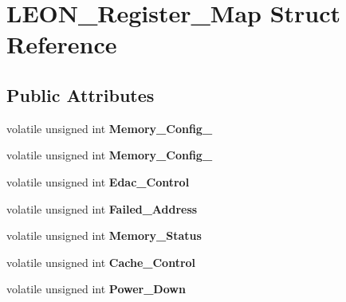 \hypertarget{struct_l_e_o_n___register___map}{
\section{LEON\_\-Register\_\-Map Struct Reference}
\label{struct_l_e_o_n___register___map}
}
\subsection*{Public Attributes}
\begin{DoxyCompactItemize}
\item 
\hypertarget{struct_l_e_o_n___register___map_a30282acaae5bf385d4243c548fb37c82}{
volatile unsigned int {\bfseries Memory\_\-Config\_}}
\label{struct_l_e_o_n___register___map_a30282acaae5bf385d4243c548fb37c82}

\item 
\hypertarget{struct_l_e_o_n___register___map_a7032e5a694fee58bf17913f55fd5f336}{
volatile unsigned int {\bfseries Memory\_\-Config\_}}
\label{struct_l_e_o_n___register___map_a7032e5a694fee58bf17913f55fd5f336}

\item 
\hypertarget{struct_l_e_o_n___register___map_abb0086571e69d7592845de920987a87c}{
volatile unsigned int {\bfseries Edac\_\-Control}}
\label{struct_l_e_o_n___register___map_abb0086571e69d7592845de920987a87c}

\item 
\hypertarget{struct_l_e_o_n___register___map_a22795fa879fefa39229ea8cbe6f206f4}{
volatile unsigned int {\bfseries Failed\_\-Address}}
\label{struct_l_e_o_n___register___map_a22795fa879fefa39229ea8cbe6f206f4}

\item 
\hypertarget{struct_l_e_o_n___register___map_aff88a4ac8955fa5541a05749ece9cbd7}{
volatile unsigned int {\bfseries Memory\_\-Status}}
\label{struct_l_e_o_n___register___map_aff88a4ac8955fa5541a05749ece9cbd7}

\item 
\hypertarget{struct_l_e_o_n___register___map_a616a15d9747eb0ab671a0b3dc21a5412}{
volatile unsigned int {\bfseries Cache\_\-Control}}
\label{struct_l_e_o_n___register___map_a616a15d9747eb0ab671a0b3dc21a5412}

\item 
\hypertarget{struct_l_e_o_n___register___map_a597ec2ee3c58b06917a8b4c29461bfc8}{
volatile unsigned int {\bfseries Power\_\-Down}}
\label{struct_l_e_o_n___register___map_a597ec2ee3c58b06917a8b4c29461bfc8}


\end{DoxyCompactItemize}
